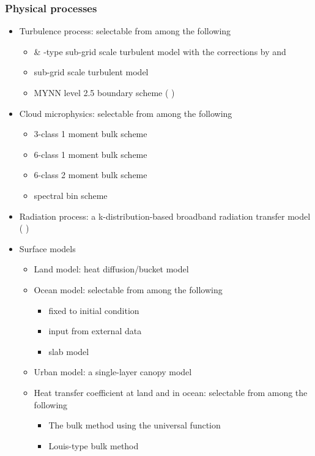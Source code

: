 \subsubsection{Physical processes}
\begin{itemize}
\item Turbulence process: selectable from among the following
  \begin{itemize}
  \item \citet{smagorinsky_1963} \& \citet{lilly_1962}-type sub-grid scale turbulent model
    with the corrections by \citet{Brown_etal_1994} and \citet{Scotti_1993}
  \item \citet{Deardorff_1980} sub-grid scale turbulent model
  \item MYNN level 2.5 boundary scheme ( \citet{my_1982,nakanishi_2004,nakanishi_2009} )
  \end{itemize}
\item Cloud microphysics: selectable from among the following
  \begin{itemize}
  \item 3-class 1 moment bulk scheme \citep{kessler_1969}
  \item 6-class 1 moment bulk scheme \citep{tomita_2008}
  \item 6-class 2 moment bulk scheme \citep{sn_2014}
  \item spectral bin scheme \citep{suzuki_etal_2010}
  \end{itemize}
\item Radiation process: a k-distribution-based broadband radiation transfer model ( \citet{sekiguchi_2008} )
\item Surface models
  \begin{itemize}
  \item Land model: heat diffusion/bucket model
  \item Ocean model: selectable from among the following
    \begin{itemize}
    \item fixed to initial condition
    \item input from external data
    \item slab model
    \end{itemize}
  \item Urban model: a single-layer canopy model \citep{kusaka_2001}
  \item Heat transfer coefficient at land and in ocean: selectable from among the following
    \begin{itemize}
    \item The bulk method using the universal function \citep{beljaars_1991,wilson_2001,nishizawa_2018}
    \item Louis-type bulk method \citep{uno_1995}
    \end{itemize}
  \end{itemize}
\end{itemize}
